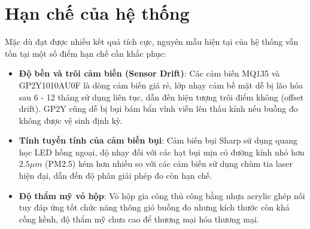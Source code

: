 \section{Hạn chế của hệ thống}
Mặc dù đạt được nhiều kết quả tích cực, nguyên mẫu hiện tại của hệ thống vẫn tồn tại một số điểm hạn chế cần khắc phục:
\begin{itemize}
    \item \textbf{Độ bền và trôi cảm biến (Sensor Drift)}: Các cảm biến MQ135 và GP2Y1010AU0F là dòng cảm biến giá rẻ, lớp nhạy cảm bề mặt dễ bị lão hóa sau 6 - 12 tháng sử dụng liên tục, dẫn đến hiện tượng trôi điểm không (offset drift). GP2Y cũng dễ bị bụi bám bẩn vĩnh viễn lên thấu kính nếu buồng đo không được vệ sinh định kỳ.
    \item \textbf{Tính tuyến tính của cảm biến bụi}: Cảm biến bụi Sharp sử dụng quang học LED hồng ngoại, độ nhạy đối với các hạt bụi mịn có đường kính nhỏ hơn $2.5\mu m$ (PM2.5) kém hơn nhiều so với các cảm biến sử dụng chùm tia laser hiện đại, dẫn đến độ phân giải phép đo còn hạn chế.
    \item \textbf{Độ thẩm mỹ vỏ hộp}: Vỏ hộp gia công thủ công bằng nhựa acrylic ghép nối tuy đáp ứng tốt chức năng thông gió buồng đo nhưng kích thước còn khá cồng kềnh, độ thẩm mỹ chưa cao để thương mại hóa thương mại.
\end{itemize}

